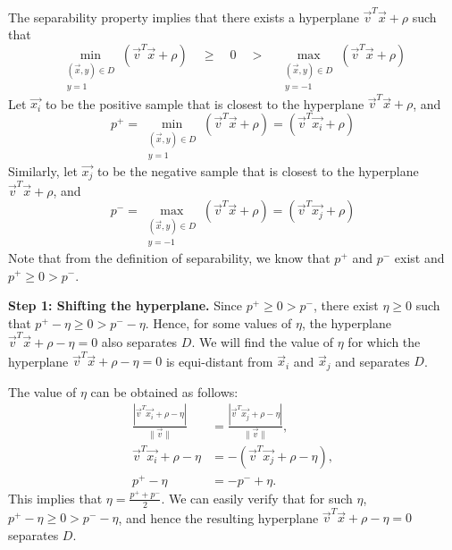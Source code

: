 \begin{enumerate}
{The separability property implies that there exists a hyperplane $\vec{v}^T \vec{x} + \rho$ such that
    \begin{equation*}
      \min_{\substack{(\vec{x},y)\in D \\ y=1}} (\vec{v}^T \vec{x} + \rho) \quad \geq \quad 0 \quad > \quad \max_{\substack{(\vec{x},y)\in D \\ y=-1}} (\vec{v}^T \vec{x} +\rho)
    \end{equation*}
    Let $\vec{x_i}$ to be the positive sample that is closest to the hyperplane
    $\vec{v}^T\vec{x} + \rho$, and 
    \begin{equation*}
      p^{+} = \min_{\substack{(\vec{x},y)\in D \\ y=1}} (\vec{v}^T \vec{x} +
      \rho) = (\vec{v}^T \vec{x_i} + \rho)
  \end{equation*}
Similarly, let $\vec{x_j}$ to be
    the negative sample that is closest to the hyperplane $\vec{v}^T\vec{x} + \rho$, and
    \begin{equation*}
    p^{-} = \max_{\substack{(\vec{x},y)\in D \\ y=-1}} (\vec{v}^T \vec{x} + \rho) = (\vec{v}^T
    \vec{x_j} + \rho)
  \end{equation*}
    Note that from the definition of separability, we know that $p^{+}$ and $p^{-}$ exist
    and $p^{+} \geq 0 > p^{-}$. 

    {\bf Step 1: Shifting the hyperplane.}
    Since $p^{+} \geq 0 > p^{-}$, there exist $\eta \geq 0$ such that
    $p^{+} - \eta \geq 0 > p^{-} - \eta$. Hence, for some values of $\eta$,
    the hyperplane $\vec{v}^{T} \vec{x} + \rho - \eta = 0$ also separates $D$.
    We will find the value of $\eta$ for which the hyperplane  
    $\vec{v}^{T} \vec{x} + \rho - \eta = 0$ is equi-distant from $\vec x_{i}$ and $\vec x_{j}$
    and separates $D$.

    The value of $\eta$ can be obtained as follows:
    \begin{equation}
      \begin{split}
        \frac{|\vec{v}^{T} \vec{x_i} + \rho - \eta|}{\|\vec{v}\|} &= 
        \frac{|\vec{v}^{T} \vec{x_j} + \rho - \eta|}{\|\vec{v}\|}, \\
        \vec{v}^T \vec{x_i} + \rho - \eta &= -(\vec{v}^T \vec{x_j} + \rho - \eta),\\
        p^{+} - \eta &= - p^{-} + \eta.
      \end{split}
    \end{equation}
    This implies that $\eta = \frac{p^{+} + p^{-}}{2}$.
    We can easily verify that for such $\eta$,
    $p^{+}-\eta \geq 0 > p^{-} - \eta$,
    and hence the resulting hyperplane $\vec{v}^{T} \vec{x} + \rho - \eta = 0$
    separates $D$.

}
\end{enumerate}
